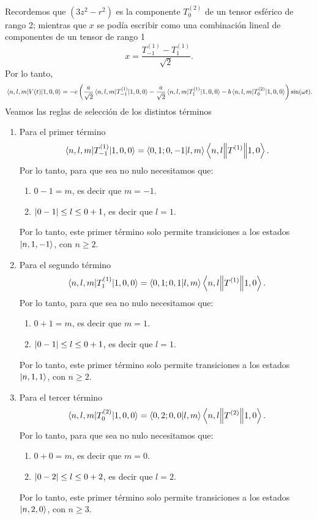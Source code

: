 \documentclass[10pt, a4paper]{article}
\numberwithin{equation}{subsection}
\begin{document}
Recordemos que $(3z^2 - r^2)$ es la componente $T^{(2)}_{0}$ de un tensor
esférico de rango 2; mientras que $x$ se podía escribir como una combinación
lineal de componentes de un tensor de rango 1
\begin{equation}
  x = \frac{T^{(1)}_{-1} - T^{(1)}_{1}}{\sqrt{2}}.
\end{equation}
Por lo tanto,
\begin{equation}
  \matrixel{n,l,m}{V(t)}{1,0,0} =
  -e\left(\frac{a}{\sqrt{2}}\matrixel{n,l,m}{T^{(1)}_{-1}}{1,0,0} -
  \frac{a}{\sqrt{2}}\matrixel{n,l,m}{T^{(1)}_{1}}{1,0,0} -b
  \matrixel{n,l,m}{T^{(2)}_{0}}{1,0,0}\right)\sin(\omega t).
\end{equation}
Veamos las reglas de selección de los distintos términos
\begin{enumerate}
  \item Para el primer término
    \begin{equation}
      \matrixel{n,l,m}{T^{(1)}_{-1}}{1,0,0} = \braket{0,1;0,-1}{l,m}
        \doublebarmel{n,l}{T^{(1)}}{1,0}.
    \end{equation}
    Por lo tanto, para que sea no nulo necesitamos que:
    \begin{enumerate}
      \item $0 - 1 = m$, es decir que $m = -1$.
      \item $\abs{0 - 1} \leq l \leq {0 + 1}$, es decir que $l = 1$.
    \end{enumerate}
    Por lo tanto, este primer término solo permite transiciones a los estados
    $\ket{n,1,-1}$, con $n \geq 2$.
  \item Para el segundo término
    \begin{equation}
      \matrixel{n,l,m}{T^{(1)}_{1}}{1,0,0} = \braket{0,1;0,1}{l,m}
        \doublebarmel{n,l}{T^{(1)}}{1,0}.
    \end{equation}
    Por lo tanto, para que sea no nulo necesitamos que:
    \begin{enumerate}
      \item $0 + 1 = m$, es decir que $m = 1$.
      \item $\abs{0 - 1} \leq l \leq {0 + 1}$, es decir que $l = 1$.
    \end{enumerate}
    Por lo tanto, este primer término solo permite transiciones a los estados
    $\ket{n,1,1}$, con $n \geq 2$.
  \item Para el tercer término
    \begin{equation}
      \matrixel{n,l,m}{T^{(2)}_{0}}{1,0,0} = \braket{0,2;0,0}{l,m}
        \doublebarmel{n,l}{T^{(2)}}{1,0}.
    \end{equation}
    Por lo tanto, para que sea no nulo necesitamos que:
    \begin{enumerate}
      \item $0 + 0 = m$, es decir que $m = 0$.
      \item $\abs{0 - 2} \leq l \leq {0 + 2}$, es decir que $l = 2$.
    \end{enumerate}
    Por lo tanto, este primer término solo permite transiciones a los estados
    $\ket{n,2,0}$, con $n \geq 3$.
\end{enumerate}
\end{document}
